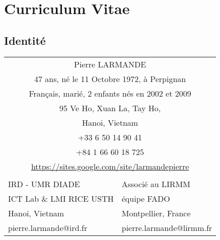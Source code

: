 \chapter{Curriculum Vitae}
\section{Identité}

\begin{center}
\begin{tabular}{cl}
\multicolumn{2}{c}{Pierre LARMANDE} \\
\multicolumn{2}{c}{47 ans, né le 11 Octobre 1972, à Perpignan} \\
\multicolumn{2}{c}{Français, marié, 2 enfants nés en 2002 et 2009} \\
\multicolumn{2}{c}{95 Ve Ho, Xuan La, Tay Ho,} \\
\multicolumn{2}{c}{Hanoi, Vietnam} \\
\multicolumn{2}{c}{+33 6 50 14 90 41} \\
\multicolumn{2}{c}{+84 1 66 60 18 725} \\
\multicolumn{2}{c}{\url{https://sites.google.com/site/larmandepierre}} \\
\multicolumn{1}{l}{} &  \\
\multicolumn{1}{l}{IRD - UMR DIADE} & Associé au LIRMM \\
\multicolumn{1}{l}{ICT Lab \& LMI RICE USTH} & équipe FADO \\
\multicolumn{1}{l}{Hanoi, Vietnam} & Montpellier, France \\
\multicolumn{1}{l}{pierre.larmande@ird.fr} & pierre.larmande@lirmm.fr
\end{tabular}
\end{center}

